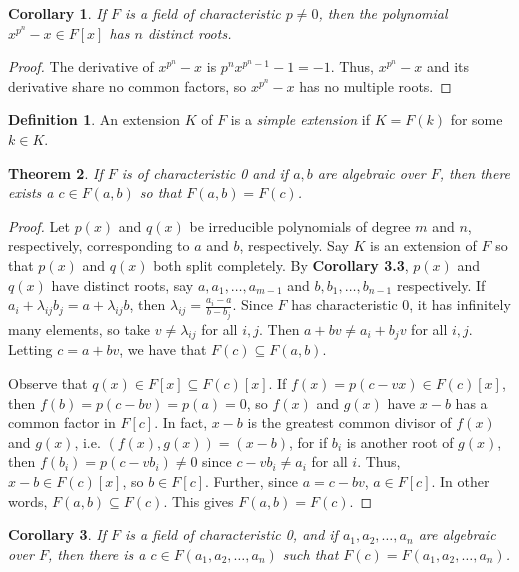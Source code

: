 \documentclass[12pt,leqno]{article}
\numberwithin{equation}{section}
\theoremstyle{plain}
\newtheorem{thm}{Theorem}[section]
\newtheorem{cor}[thm]{Corollary}
\theoremstyle{definition}
\newtheorem*{Def}{Definition}
\theoremstyle{remark}
\begin{document}
\begin{cor}
 If $F$ is a field of characteristic $p\not=0$, then the polynomial $x^{p^n}-x\in F[x]$ has $n$ distinct roots.
\end{cor}

\begin{proof}
 The derivative of $x^{p^n}-x$ is $p^nx^{p^n-1}-1=-1$. Thus, $x^{p^n}-x$ and its derivative share no common factors, so $x^{p^n}-x$ has no multiple roots.
\end{proof}

\begin{Def}
 An extension $K$ of $F$ is a \textit{simple extension} if $K=F(k)$ for some $k\in K$.
\end{Def}

\begin{thm}
 If $F$ is of characteristic 0 and if $a,b$ are algebraic over $F$, then there exists a $c\in F(a,b)$ so that $F(a,b)=F(c)$.
\end{thm}

\begin{proof}
 Let $p(x)$ and $q(x)$ be irreducible polynomials of degree $m$ and $n$, respectively, corresponding to $a$ and $b$, respectively. Say $K$ is an extension of $F$ so that $p(x)$ and $q(x)$ both split completely. By \textbf{Corollary 3.3}, $p(x)$ and $q(x)$ have distinct roots, say $a,a_1,\hdots,a_{m-1}$ and $b,b_1,\hdots,b_{n-1}$ respectively. If $a_i+\lambda_{ij} b_j=a+\lambda_{ij} b$, then $\lambda_{ij}=\frac{a_i-a}{b-b_j}$. Since $F$ has characteristic 0, it has infinitely many elements, so take $v\not=\lambda_{ij}$ for all $i,j$. Then $a+bv\not=a_i+b_jv$ for all $i,j$. Letting $c=a+bv$, we have that $F(c)\subseteq F(a,b)$. 

Observe that $q(x)\in F[x]\subseteq F(c)[x]$. If $f(x)=p(c-vx)\in F(c)[x]$, then $f(b)=p(c-bv)=p(a)=0$, so $f(x)$ and $g(x)$ have $x-b$ has a common factor in $F[c]$. In fact, $x-b$ is the greatest common divisor of $f(x)$ and $g(x)$, i.e. $(f(x),g(x))=(x-b)$, for if $b_i$ is another root of $g(x)$, then $f(b_i)=p(c-vb_i)\not=0$ since $c-vb_i\not=a_i$ for all $i$. Thus, $x-b\in F(c)[x]$, so $b\in F[c]$. Further, since $a=c-bv$, $a\in F[c]$. In other words, $F(a,b)\subseteq F(c)$. This gives $F(a,b)=F(c)$.
\end{proof}

\begin{cor}
If $F$ is a field of characteristic 0, and if $a_1,a_2,\hdots,a_n$ are algebraic over $F$, then there is a $c\in F(a_1,a_2,\hdots,a_n)$ such that $F(c)=F(a_1,a_2,\hdots,a_n)$.
\end{cor}
\end{document}
